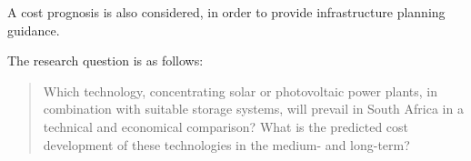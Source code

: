 A cost prognosis is also considered, in order to provide infrastructure planning guidance.

The research question is as follows:
\begin{quote}
Which technology, concentrating solar or photovoltaic power plants, in combination with suitable storage systems, will prevail in South Africa in a technical and economical comparison? What is the predicted cost development of these technologies in the medium- and long-term?
\end{quote}